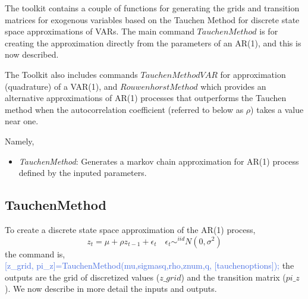 The toolkit contains a couple of functions for generating the grids and transition matrices for exogenous variables based on the Tauchen Method for
discrete state space approximations of VARs. The main command $TauchenMethod$ is for creating the approximation directly from the parameters of an AR(1),
and this is now described.

The Toolkit also includes commands $TauchenMethodVAR$ for approximation (quadrature) of a VAR(1), and $RouwenhorstMethod$ which provides an alternative 
approximations of AR(1) processes that outperforms the Tauchen method when the autocorrelation coefficient (referred to below as $\rho$) takes a value
near one.


\noindent Namely,
\begin{itemize}
 \item \textit{TauchenMethod}: Generates a markov chain approximation for AR(1) process defined by the inputed parameters.
\end{itemize}


\subsection{TauchenMethod}
To create a discrete state space approximation of the AR(1) process,
\begin{equation} \label{eqn:ar1}
 z_t =\mu +\rho z_{t-1} +\epsilon_t \quad \epsilon_t \sim^{iid} N(0,\sigma^2)
\end{equation}
the command is, \\
\indent \textcolor{RoyalBlue}{[z\_{}grid, pi\_{}z]=TauchenMethod(mu,sigmasq,rho,znum,q, [tauchenoptions]);}
the outputs are the grid of discretized values ($z\_{}grid$) and the transition matrix ($pi\_{}z$). 
We now describe in more detail the inputs and outputs.

